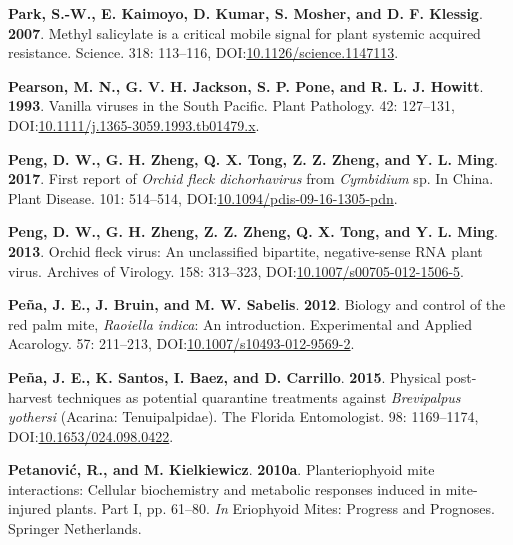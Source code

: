\documentclass[12pt,final,CPage]{ufthesis}
\newlength{\cslhangindent}
\newenvironment{CSLReferences}[2] %
{%
	\setlength{\parindent}{0pt}
	\ifodd #1 \everypar{\setlength{\hangindent}{\cslhangindent}}\ignorespaces\fi
	\ifnum #2 > 0
	\setlength{\parskip}{#2\baselineskip}
	\fi
}%
{}
\begin{document}
{\begin{CSLReferences}{1}{0}
  \leavevmode{}%
  \textbf{Park, S.-W., E. Kaimoyo, D. Kumar, S. Mosher, and D. F. Klessig}. \textbf{2007}. Methyl salicylate is a critical mobile signal for plant systemic acquired resistance. Science. 318: 113--116, DOI:\href{https://doi.org/10.1126/science.1147113}{10.1126/science.1147113}.

  \leavevmode{}%
  \textbf{Pearson, M. N., G. V. H. Jackson, S. P. Pone, and R. L. J. Howitt}. \textbf{1993}. Vanilla viruses in the {South Pacific}. Plant Pathology. 42: 127--131, DOI:\href{https://doi.org/10.1111/j.1365-3059.1993.tb01479.x}{10.1111/j.1365-3059.1993.tb01479.x}.

  \leavevmode{}%
  \textbf{Peng, D. W., G. H. Zheng, Q. X. Tong, Z. Z. Zheng, and Y. L. Ming}. \textbf{2017}. First report of {\emph{Orchid fleck dichorhavirus}} from {\emph{Cymbidium}} sp. In {China}. Plant Disease. 101: 514--514, DOI:\href{https://doi.org/10.1094/pdis-09-16-1305-pdn}{10.1094/pdis-09-16-1305-pdn}.

  \leavevmode{}%
  \textbf{Peng, D. W., G. H. Zheng, Z. Z. Zheng, Q. X. Tong, and Y. L. Ming}. \textbf{2013}. {Orchid fleck virus}: An unclassified bipartite, negative-sense {RNA} plant virus. Archives of Virology. 158: 313--323, DOI:\href{https://doi.org/10.1007/s00705-012-1506-5}{10.1007/s00705-012-1506-5}.

  \leavevmode{}%
  \textbf{Peña, J. E., J. Bruin, and M. W. Sabelis}. \textbf{2012}. Biology and control of the red palm mite, {\emph{Raoiella indica}}: An introduction. Experimental and Applied Acarology. 57: 211--213, DOI:\href{https://doi.org/10.1007/s10493-012-9569-2}{10.1007/s10493-012-9569-2}.

  \leavevmode{}%
  \textbf{Peña, J. E., K. Santos, I. Baez, and D. Carrillo}. \textbf{2015}. Physical post-harvest techniques as potential quarantine treatments against {\emph{Brevipalpus yothersi}} ({Acarina}: {Tenuipalpidae}). The Florida Entomologist. 98: 1169--1174, DOI:\href{https://doi.org/10.1653/024.098.0422}{10.1653/024.098.0422}.

  \leavevmode{}%
  \textbf{Petanović, R., and M. Kielkiewicz}. \textbf{2010a}. Plant{\textendash}eriophyoid mite interactions: Cellular biochemistry and metabolic responses induced in mite-injured plants. Part {I}, pp. 61--80. \emph{In} Eriophyoid Mites: Progress and Prognoses. Springer Netherlands.


\end{CSLReferences}}
\end{document}
